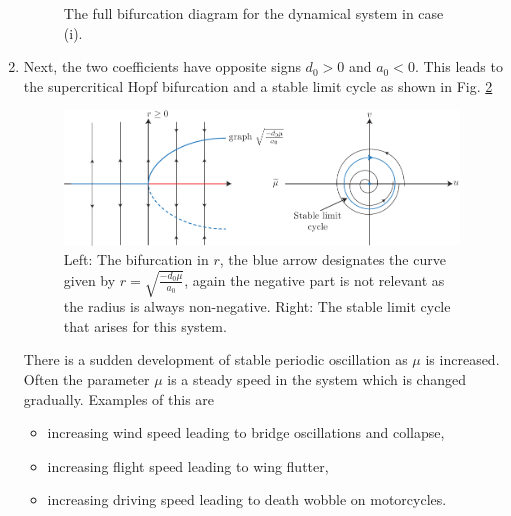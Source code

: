 \begin{enumerate}
\begin{figure}[h!]
			\caption{The full bifurcation diagram for the dynamical system in case (i).}
			\label{fig:case1_full_bif}
		\end{figure}
	\item Next, the two coefficients have opposite signs $d_0 > 0$ and $a_0 <0$. This leads to the supercritical Hopf bifurcation and a stable limit cycle as shown in Fig. \ref{fig:case2_bif}
		\begin{figure}[h!]
			\centering
			\includegraphics[width=0.99\textwidth]{figures/ch3/22case2_r_bif.pdf}
			\caption{Left: The bifurcation in $r$, the blue arrow designates the curve given by $r=\sqrt{\frac{-d_0 \mu }{a_0}}$, again the negative part is not relevant as the radius is always non-negative. Right: The stable limit cycle that arises for this system.}
			\label{fig:case2_bif}
		\end{figure}
	
		There is a sudden development of stable periodic oscillation as $\mu  $ is increased. Often the parameter $\mu $ is a steady speed in the system which is changed gradually. Examples of this are 
		\begin{itemize}
			\item increasing wind speed leading to bridge oscillations and collapse,
			\item increasing flight speed leading to wing flutter,
			\item increasing driving speed leading to death wobble on motorcycles.
		\end{itemize}
		
\end{enumerate}

